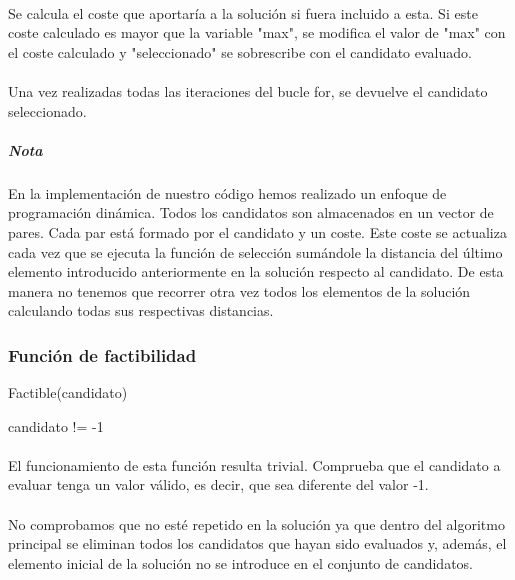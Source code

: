 \documentclass{article}
\begin{document}
	\paragraph{}Se calcula el coste que aportaría a la solución si fuera incluido a esta. Si este coste calculado es mayor que la variable "max", se modifica el valor de "max" con el coste calculado y "seleccionado" se sobrescribe con el candidato evaluado.
	
	\paragraph{}Una vez realizadas todas las iteraciones del bucle for, se devuelve el candidato seleccionado.
	
	\subparagraph{Nota}En la implementación de nuestro código hemos realizado un enfoque de programación dinámica. Todos los candidatos son almacenados en un vector de pares. Cada par está formado por el candidato y un coste. Este coste se actualiza cada vez que se ejecuta la función de selección sumándole la distancia del último elemento introducido anteriormente en la solución respecto al candidato. De esta manera no tenemos que recorrer otra vez todos los elementos de la solución calculando todas sus respectivas distancias.
	
	\subsubsection{Función de factibilidad}
	\begin{algorithm}[H]
		\caption{Factible(candidato)}
		\begin{algorithmic}
			\RETURN candidato != -1
		\end{algorithmic}
	\end{algorithm}
	
	\paragraph{}El funcionamiento de esta función resulta trivial. Comprueba que el candidato a evaluar tenga un valor válido, es decir, que sea diferente del valor -1. 
	
	\paragraph{}No comprobamos que no esté repetido en la solución ya que dentro del algoritmo principal se eliminan todos los candidatos que hayan sido evaluados y, además, el elemento inicial de la solución no se introduce en el conjunto de candidatos. 
	
\end{document}
